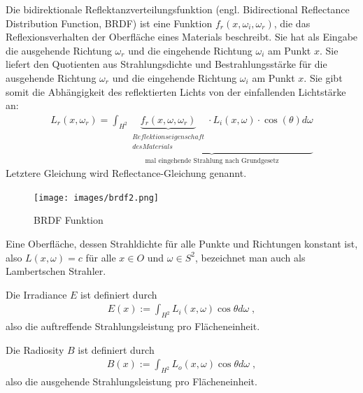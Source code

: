 \begin{Definition}
Die  bidirektionale Reflektanzverteilungsfunktion (engl. Bidirectional Reflectance Distribution Function, BRDF)
ist eine Funktion $f_r (x, \omega_i, \omega_r)$, die das Reflexionsverhalten der Oberfläche eines Materials beschreibt. 
Sie hat als Eingabe die ausgehende Richtung $\omega_r$ und die eingehende Richtung  $\omega_i$ am Punkt $x$. 
Sie  liefert den Quotienten aus Strahlungsdichte und Bestrahlungsstärke für die ausgehende Richtung $\omega_r$ und die eingehende Richtung  $\omega_i$ am Punkt $x$.
Sie gibt somit die Abhängigkeit des reflektierten Lichts von der einfallenden Lichtstärke an: 
\begin{align}
L_r(x, \omega_r) = \underbrace{\int_{H^2} \underbrace{f_r (x, \omega, \omega_r)}_{\substack{Reflektionseigenschaft \\ des Materials}} \cdot L_i(x, \omega) \cdot  \cos(\theta) d\omega}_{\text{mal eingehende Strahlung nach Grundgesetz}}
\end{align}
Letztere Gleichung wird  Reflectance-Gleichung genannt.
\end{Definition}
 \begin{figure}[H]
    \centering
    \texttt{[image: images/brdf2.png]}
    \caption{BRDF Funktion}
    \label{fig:raytracin_brdf}
\end{figure}


\begin{Definition}
Eine Oberfläche, dessen Strahldichte für alle Punkte und Richtungen konstant ist, also
$L(x, \omega) = c$  für alle $x \in O$ und $\omega \in S^2$, bezeichnet man auch als Lambertschen Strahler. 
\end{Definition}

\begin{Definition}
Die Irradiance $E$ ist definiert durch
\begin{align}
E(x) := \int_{H^2} L_i(x, \omega) \cos{\theta} d\omega \; ,
\end{align}
also die auftreffende Strahlungsleistung pro Flächeneinheit. 
\end{Definition}

\begin{Definition}
Die Radiosity $B$ ist definiert durch
\begin{align}
B(x) := \int_{H^2} L_o(x, \omega) \cos{\theta} d\omega \; ,
\end{align}
also die ausgehende Strahlungsleistung pro Flächeneinheit. 
\end{Definition}





